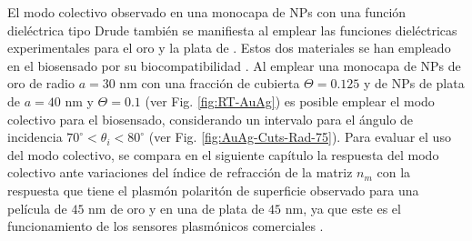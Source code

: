 El modo colectivo observado en una monocapa de NPs con una función dieléctrica tipo Drude también se manifiesta al emplear las funciones dieléctricas experimentales para el oro y la plata de \cite{johnson1972constants}. Estos dos materiales se han empleado en el biosensado por su biocompatibilidad \cite{fan2009bio,bosetti2002silver}. Al emplear una monocapa de NPs de oro de radio $a=30$ nm con una fracción de cubierta $\Theta=0.125$ y de NPs de plata de $a=40$ nm y $\Theta=0.1$ (ver Fig. \ref{fig:RT-AuAg}) es posible emplear el modo colectivo para el biosensado, considerando un intervalo para el ángulo de incidencia $70^\circ<\theta_i<80^\circ$ (ver Fig. \ref{fig:AuAg-Cuts-Rad-75}). Para evaluar el uso del modo colectivo, se compara en el siguiente capítulo la respuesta del modo colectivo ante variaciones del índice de refracción de la matriz $n_m$ con la respuesta que tiene el plasmón polaritón de superficie observado para una película de $45$ nm de oro y en una de plata de $45$ nm, ya que este es el funcionamiento de los sensores plasmónicos comerciales \cite{kabashin2009plasmonic}. 
